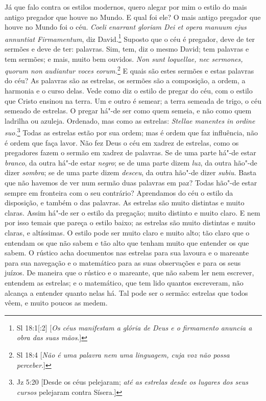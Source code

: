 Já que falo contra os estilos modernos, quero alegar por mim o estilo do
mais antigo pregador que houve no Mundo. E qual foi ele? O mais
antigo pregador que houve no Mundo foi o céu. \emph{Coeli enarrant
gloriam Dei et opera manuum ejus annuntiat Firmamentum}, diz David.\footnote{Sl 18:1[:2] [\emph{Os céus manifestam a glória de Deus e o firmamento anuncia a obra das suas mãos}.]}
Suposto que o céu é pregador, deve de ter sermões e deve de ter:
palavras. Sim, tem, diz o mesmo David; tem palavras e tem sermões; e
mais, muito bem ouvidos. \emph{Non sunt loquellae, nec sermones, quorum
non audiantur voces eorum.}\footnote{Sl 18:4 [\emph{Não é uma palavra nem uma linguagem, cuja voz não possa perceber}.]} E quais são estes sermões e estas palavras
do céu? As palavras são as estrelas, os sermões são a composição, a
ordem, a harmonia e o curso delas. Vede como diz o estilo de pregar do
céu, com o estilo que Cristo ensinou na terra. Um e outro é semear; a
terra semeada de trigo, o céu semeado de estrelas. O pregar há"-de ser
como quem semeia, e não como quem ladrilha ou azuleja. Ordenado, mas
como as estrelas: \emph{Stellae manentes in ordine suo.}\footnote{Jz 5:20 [Desde os céus pelejaram; \emph{até as estrelas desde os lugares dos seus cursos} pelejaram contra
Sísera.]} Todas as
estrelas estão por sua ordem; mas é ordem que faz influência, não é
ordem que faça lavor. Não fez Deus o céu em xadrez de estrelas, como os
pregadores fazem o sermão em xadrez de palavras. Se de uma parte há"-de
estar \emph{branco}, da outra há"-de estar \emph{negro}; se de uma parte
dizem \emph{luz}, da outra hão"-de dizer \emph{sombra}; se de uma parte
dizem \emph{desceu}, da outra hão"-de dizer \emph{subiu}. Basta que não
havemos de ver num sermão duas palavras em paz? Todas hão"-de estar
sempre em fronteira com o seu contrário? Aprendamos do céu o estilo da
disposição, e também o das palavras. As estrelas são muito distintas e
muito claras. Assim há"-de ser o estilo da pregação; muito distinto e
muito claro. E nem por isso temais que pareça o estilo baixo; as
estrelas são muito distintas e muito claras, e altíssimas. O estilo pode
ser muito claro e muito alto;
tão claro que o entendam os que não sabem e tão alto que tenham muito
que entender os que sabem. O rústico acha documentos nas estrelas para
sua lavoura e o mareante para sua navegação e o matemático para as suas
observações e para os seus juízos. De maneira que o rústico e o
mareante, que não sabem ler nem escrever, entendem as estrelas; e o
matemático, que tem lido quantos escreveram, não alcança a entender
quanto nelas há. Tal pode ser o sermão: estrelas que todos vêem, e
muito poucos as medem.

